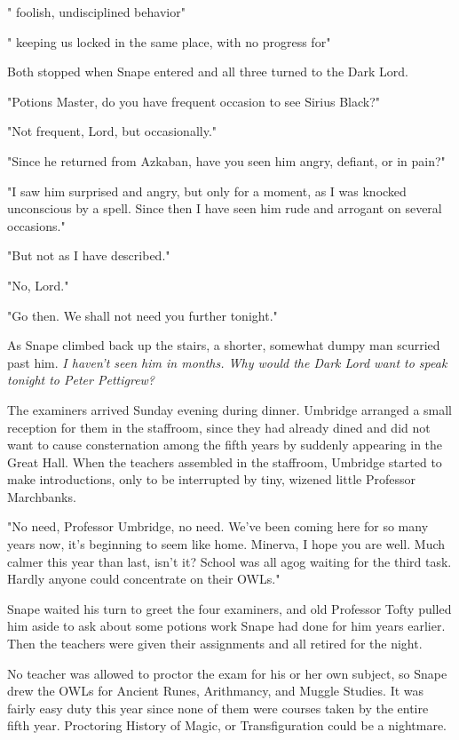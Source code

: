 "{\el} foolish, undisciplined behavior{\el}"

"{\el} keeping us locked in the same place, with no progress for{\el}"

Both stopped when Snape entered and all three turned to the Dark Lord.

"Potions Master, do you have frequent occasion to see Sirius Black?"

"Not frequent, Lord, but occasionally."

"Since he returned from Azkaban, have you seen him angry, defiant, or in pain?"

"I saw him surprised and angry, but only for a moment, as I was knocked unconscious by a spell. Since then I have seen him rude and arrogant on several occasions."

"But not as I have described."

"No, Lord."

"Go then. We shall not need you further tonight."

As Snape climbed back up the stairs, a shorter, somewhat dumpy man scurried past him. \emph{I haven't seen him in months. Why would the Dark Lord want to speak tonight to Peter Pettigrew?}

The examiners arrived Sunday evening during dinner. Umbridge arranged a small reception for them in the staffroom, since they had already dined and did not want to cause consternation among the fifth years by suddenly appearing in the Great Hall. When the teachers assembled in the staffroom, Umbridge started to make introductions, only to be interrupted by tiny, wizened little Professor Marchbanks.

"No need, Professor Umbridge, no need. We've been coming here for so many years now, it's beginning to seem like home. Minerva, I hope you are well. Much calmer this year than last, isn't it? School was all agog waiting for the third task. Hardly anyone could concentrate on their OWLs."

Snape waited his turn to greet the four examiners, and old Professor Tofty pulled him aside to ask about some potions work Snape had done for him years earlier. Then the teachers were given their assignments and all retired for the night.

No teacher was allowed to proctor the exam for his or her own subject, so Snape drew the OWLs for Ancient Runes, Arithmancy, and Muggle Studies. It was fairly easy duty this year since none of them were courses taken by the entire fifth year. Proctoring History of Magic, or Transfiguration could be a nightmare.

